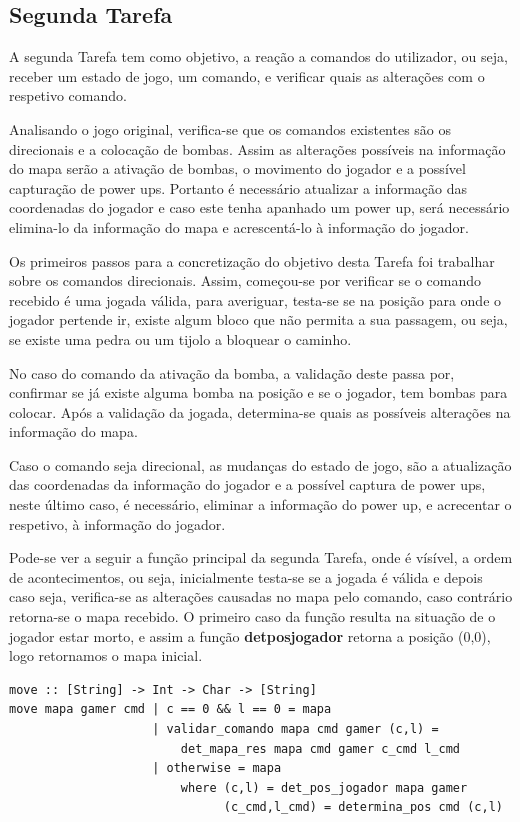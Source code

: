 \documentclass[4apaper]{report}
\begin{document}
\subsection{Segunda Tarefa}
A segunda Tarefa tem como objetivo, a reação a comandos do utilizador, ou seja, receber um estado de jogo, um comando, e verificar quais as alterações com o respetivo comando.

Analisando o jogo original, verifica-se que os comandos existentes são os direcionais e a colocação de bombas.  Assim as alterações possíveis na informação do mapa serão a ativação de bombas, o movimento do jogador e a possível capturação de power ups. Portanto é necessário atualizar a informação das coordenadas do jogador e caso este tenha apanhado um power up, será necessário elimina-lo da informação do mapa e acrescentá-lo à informação do jogador.

Os primeiros passos para a concretização do objetivo desta Tarefa foi trabalhar sobre os comandos direcionais. Assim, começou-se por verificar se o comando recebido é uma jogada válida, para averiguar, testa-se se na posição para onde o jogador pertende ir, existe algum bloco que não permita a sua passagem, ou seja, se existe uma pedra ou um tijolo a bloquear o caminho. 

No caso do comando da ativação da bomba, a validação deste passa por, confirmar se já existe alguma bomba na posição e se o jogador, tem bombas para colocar. Após a validação da jogada, determina-se quais as possíveis alterações na informação do mapa. 

Caso o comando seja direcional, as mudanças do estado de jogo, são a atualização das coordenadas da informação do jogador e a possível captura de power ups, neste último caso, é necessário, eliminar a informação do power up, e acrecentar o respetivo, à informação do jogador. 

Pode-se ver a seguir a função principal da segunda Tarefa, onde é vísível, a ordem de acontecimentos, ou seja, inicialmente testa-se se a jogada é válida e depois caso seja, verifica-se as alterações causadas no mapa pelo comando, caso contrário retorna-se o mapa recebido. O primeiro caso da função resulta na situação de o jogador estar morto, e assim a função \textbf{detposjogador} retorna a posição (0,0), logo retornamos o mapa inicial.

\begin{verbatim}
move :: [String] -> Int -> Char -> [String]  
move mapa gamer cmd | c == 0 && l == 0 = mapa 
				    | validar_comando mapa cmd gamer (c,l) = 
				    	det_mapa_res mapa cmd gamer c_cmd l_cmd 
				    | otherwise = mapa 
				        where (c,l) = det_pos_jogador mapa gamer
				              (c_cmd,l_cmd) = determina_pos cmd (c,l)
\end{verbatim}
\end{document}
